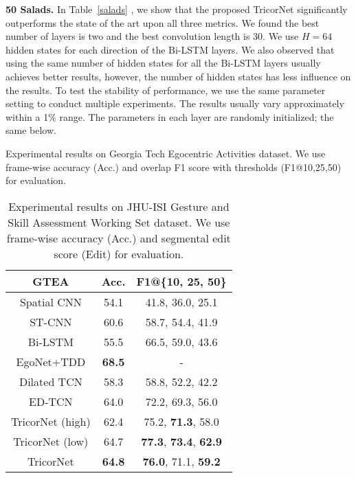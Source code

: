 \documentclass{article}
\begin{document}
\noindent \textbf{50 Salads.} \quad In Table~\ref{salads} , we show that the proposed TricorNet significantly outperforms the state of the art upon all three metrics. We found the best number of layers is two and the best convolution length is 30. We use $H = 64$ hidden states for each direction of the Bi-LSTM layers. We also observed that using the same number of hidden states for all the Bi-LSTM layers usually achieves better results, however, the number of hidden states has less influence on the results. To test the stability of performance, we use the same parameter setting to conduct multiple experiments. The results usually vary approximately within a 1\% range. The parameters in each layer are randomly initialized; the same below.

\begin{table}
	\parbox[t]{.52\linewidth}{
		\centering
		\caption{Experimental results on Georgia Tech Egocentric Activities dataset. We use frame-wise accuracy (Acc.) and overlap F1 score with thresholds (F1@10,25,50) for evaluation.}
		\label{gtea}
		\begin{tabular}{|c|c|c|}
			\hline
			\textbf{GTEA}        & \textbf{Acc.} & \textbf{F1@\{10, 25, 50\}} \\ \hline
			Spatial CNN \cite{scnn} & 54.1              & 41.8, 36.0, 25.1                \\
			ST-CNN \cite{scnn}      & 60.6              & 58.7, 54.4, 41.9                \\
			Bi-LSTM      & 55.5              & 66.5, 59.0, 43.6                \\
			EgoNet+TDD \cite{ego}  & \textbf{68.5}              & -                   \\
			Dilated TCN \cite{LeFlViCVPR2017} & 58.3              & 58.8, 52.2, 42.2                \\
			ED-TCN \cite{LeFlViCVPR2017}      & 64.0              & 72.2, 69.3, 56.0                \\ \hline
			TricorNet (high)                & 62.4              & 75.2, \textbf{71.3}, 58.0              \\
			TricorNet (low)                & 64.7              & \textbf{77.3}, \textbf{73.4}, \textbf{62.9}              \\
			TricorNet                 & \textbf{64.8}              & \textbf{76.0}, 71.1, \textbf{59.2}             \\
			\hline
		\end{tabular}
	}
	\hfill
	\parbox[t]{.41\linewidth}{
		\centering
		\caption{Experimental results on JHU-ISI Gesture and Skill Assessment Working Set dataset. We use frame-wise accuracy (Acc.) and segmental edit score (Edit) for evaluation.}
}
\end{table}
\end{document}
